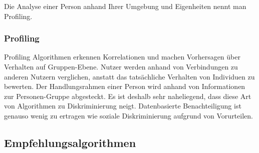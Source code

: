 Die Analyse einer Person anhand Ihrer Umgebung und Eigenheiten nennt man Profiling. 

\subsubsection{Profiling}
Profiling Algorithmen erkennen Korrelationen und machen Vorhersagen über Verhalten auf Gruppen-Ebene. Nutzer werden anhand von Verbindungen zu anderen Nutzern verglichen, anstatt das tatsächliche Verhalten von Individuen zu bewerten. Der Handlungsrahmen einer Person wird anhand von Informationen zur Personen-Gruppe abgesteckt. Es ist deshalb sehr naheliegend, dass diese Art von Algorithmen zu Diskriminierung neigt. Datenbasierte Benachteiligung ist genauso wenig zu ertragen wie soziale Diskriminierung aufgrund von Vorurteilen. 

\subsection{Empfehlungsalgorithmen}


